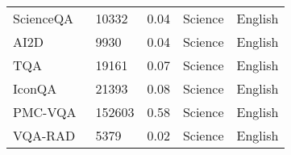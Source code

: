 \begin{table}[h]
\begin{tabular}{l|l|l|l|l}
ScienceQA~\cite{lu2022learn}                       & 10332   & 0.04     & Science      & English         \\
AI2D~\cite{kembhavi2016diagram}                            & 9930    & 0.04     & Science      & English         \\
TQA~\cite{kembhavi2017you}                             & 19161    & 0.07     & Science      & English         \\
IconQA~\cite{lu2021iconqa}                          & 21393    & 0.08     & Science      & English         \\
PMC-VQA~\cite{zhang2023pmcvqa}                         & 152603  & 0.58     & Science      & English         \\
VQA-RAD~\cite{lau2018dataset}                         & 5379    & 0.02     & Science   & English         \\
\bottomrule
\end{tabular}
\end{table}


